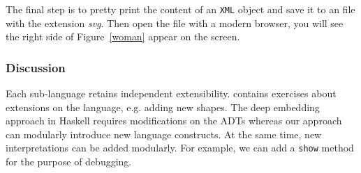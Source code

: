 The final step is to pretty print the content of an \texttt{XML} object and
save it to an file with the extension \emph{svg}.
Then open the file with a modern browser, you will see the right side of
Figure~\ref{woman} appear on the screen.

\subsubsection{Discussion}
Each sub-language retains independent extensibility.
\cite{} contains exercises about extensions on the language, e.g.
adding new shapes.
The deep embedding approach in Haskell requires modifications on the ADTs
whereas our approach can modularly introduce new language constructs.
At the same time, new interpretations can be added modularly.
For example, we can add a \texttt{show} method for the purpose of debugging.

